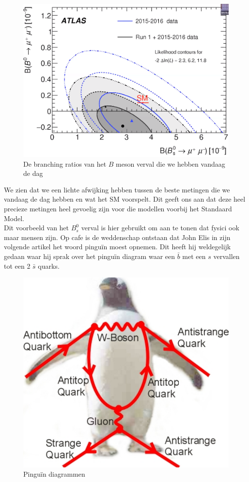 \documentclass[../main.tex]{subfiles}
\begin{document}
\begin{figure}[h]
    \centering
    \includegraphics[width=0.6\linewidth]{physics_beyond_the_standard_model/bs_meson_resultaten_vandaag.png}
    \caption{De branching ratios van het $B$ meson verval die we hebben vandaag de dag}%
    \label{fig:physics_beyond_the_standard_model/bs_meson_resultaten_vandaag}
\end{figure}

We zien dat we een lichte afwijking hebben tussen de beste metingen die we vandaag de dag hebben en wat het SM voorspelt. Dit geeft ons aan dat deze heel precieze metingen heel gevoelig zijn voor die modellen voorbij het Standaard Model.\\
Dit voorbeeld van het $B_s^0$ verval is hier gebruikt om aan te tonen dat fysici ook maar mensen zijn. Op cafe is de weddenschap ontstaan dat John Elis in zijn volgende artikel het woord pinguïn moest opnemen. Dit heeft hij weldegelijk gedaan waar hij sprak over het pinguïn diagram waar een $\bar{b}$ met een $s$ vervallen tot een 2 $\bar{s}$ quarks.

\begin{figure}[h]
    \centering
    \includegraphics[width=0.8\linewidth]{physics_beyond_the_standard_model/pinguin_diagrammen.png}
    \caption{Pinguïn diagrammen}%
    \label{fig:physics_beyond_the_standard_model/pinguin_diagrammen}
\end{figure}
\end{document}
